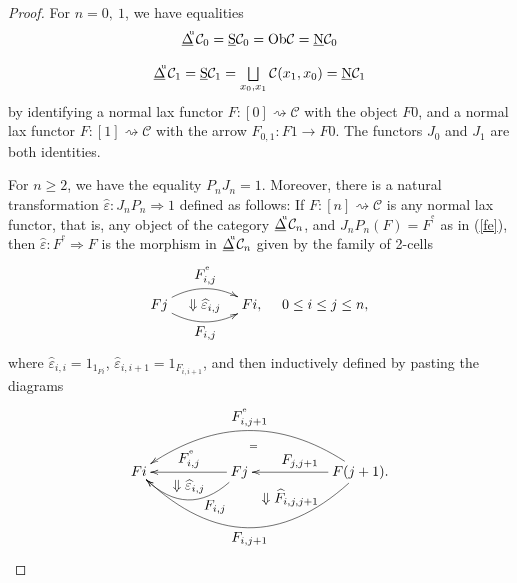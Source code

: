\documentclass[]{amsart}
\begin{document}
\begin{proof}
For $n=0,\ 1$, we have equalities
$$
\begin{array}{c}
{\ensuremath{\underline{\Delta}}}\hspace{-3pt}^{^\mathrm{u}}{\ensuremath{\mathcal{C}}}_0=\underline{\mathrm{S}}{\ensuremath{\mathcal{C}}}_0  =  \mbox{Ob}{\ensuremath{\mathcal{C}}}= {\ensuremath{\underline{\mathrm{N}}}}{\ensuremath{\mathcal{C}}}_0  \\
  \\
{\ensuremath{\underline{\Delta}}}\hspace{-3pt}^{^\mathrm{u}}{\ensuremath{\mathcal{C}}}_1=\underline{\mathrm{S}}{\ensuremath{\mathcal{C}}}_1  =  \bigsqcup\limits_{x_0,x_1}{\ensuremath{\mathcal{C}}}(x_1,x_0)  =  {\ensuremath{\underline{\mathrm{N}}}}{\ensuremath{\mathcal{C}}}_1 \\
\end{array}
$$
by identifying a normal lax functor $F:[0]\rightsquigarrow{\ensuremath{\mathcal{C}}}$ with the object $F0$, and a normal
lax functor $F:[1]\rightsquigarrow{\ensuremath{\mathcal{C}}}$ with the arrow $F_{0,1}:F1\to F0$. The functors $J_0$ and
$J_1$ are both identities.

For $n\geq 2$, we have the equality $P_nJ_n=1$. Moreover, there is a natural transformation
$\widehat{\varepsilon}:J_nP_n\Rightarrow 1$ defined as follows: If $F:[n]\rightsquigarrow {\ensuremath{\mathcal{C}}}$ is
any normal lax functor, that is, any object of the category
${\ensuremath{\underline{\Delta}}}\hspace{-3pt}^{^\mathrm{u}}{\ensuremath{\mathcal{C}}}_n$, and $J_nP_n(F)= F^{^{\mathrm e}}$ as in (\ref{fe}), then
$\widehat{\varepsilon} :F^{^{\mathrm e}}\Rightarrow F$ is the morphism in
${\ensuremath{\underline{\Delta}}}\hspace{-3pt}^{^\mathrm{u}}{\ensuremath{\mathcal{C}}}_n$ given  by the family of 2-cells
$$
\xymatrix@C=9pt@R=9pt{ Fj \ar@/^1pc/[rr]^{\textstyle F^{^{\mathrm e}}_{i,j}}
\ar@/_1pc/[rr]_{\textstyle F_{i,j}} &  \Downarrow \widehat{\varepsilon}_{i,j} & Fi,&0\leq i \leq
j\leq n,}
$$
where $\widehat{\varepsilon}_{i,i}=1_{1_{Fi}}$, $\widehat{\varepsilon}_{i,i+1}=1_{F_{i,i+1}}$, and
then inductively defined by pasting the diagrams
$$
\xymatrix{&&&\ar@{}[dd]|>>>>>>{\textstyle \Downarrow
\widehat{F}_{i,j,j+1}}&\\Fi\ar@{}[rrrru]|-{=}&&Fj\ar[ll]_{\textstyle F^{^{\mathrm
e}}_{i,j}}\ar@/^20pt/[ll]^<<<<<{\textstyle F_{i,j}}&&F(j+1). \ar@/_30pt/[llll]_{\textstyle
F^{^{\mathrm e}}_{i,j+1}}\ar[ll]_{\textstyle F_{j,j+1}}\ar@/^40pt/[llll]^{\textstyle
F_{i,j+1}}\\&\ar@{}[u]|>>>{\textstyle \Downarrow \widehat{\varepsilon}_{i,j}}&&&}
$$


\end{proof}
\end{document}
